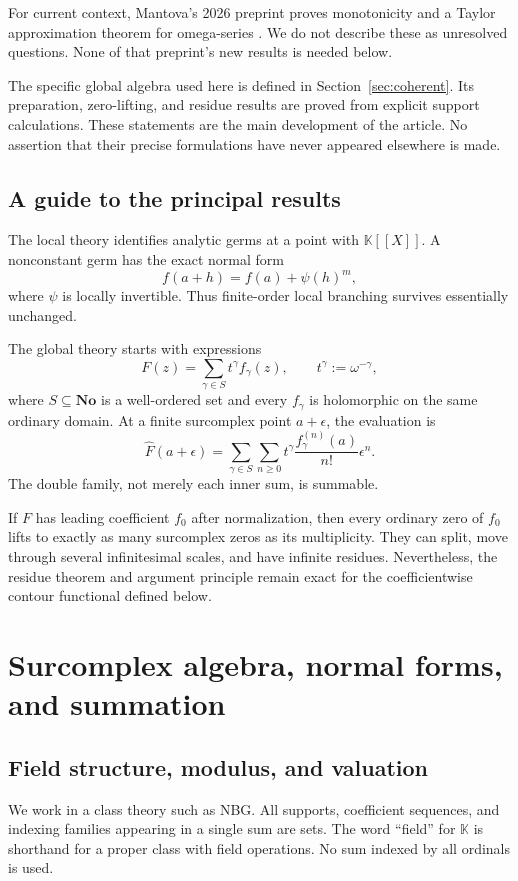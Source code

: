 \documentclass[11pt,a4paper]{article}
\theoremstyle{definition}\newtheorem{definition}[theorem]{Definition}
\theoremstyle{remark}\newtheorem{remark}[theorem]{Remark}
\newcommand{\No}{\mathbf{No}}
\newcommand{\K}{\mathbb K}
\newcommand{\ev}[1]{\widehat{#1}}
\numberwithin{equation}{section}
\begin{document}
For current context, Mantova's 2026 preprint proves monotonicity and a Taylor approximation theorem for omega-series \cite{Mantova2026}. We do not describe these as unresolved questions. None of that preprint's new results is needed below.

The specific global algebra used here is defined in Section~\ref{sec:coherent}. Its preparation, zero-lifting, and residue results are proved from explicit support calculations. These statements are the main development of the article. No assertion that their precise formulations have never appeared elsewhere is made.

\subsection{A guide to the principal results}
The local theory identifies analytic germs at a point with $\K[[X]]$. A nonconstant germ has the exact normal form
\[
 f(a+h)=f(a)+\psi(h)^m,
\]
where $\psi$ is locally invertible. Thus finite-order local branching survives essentially unchanged.

The global theory starts with expressions
\[
 F(z)=\sum_{\gamma\in S}t^\gamma f_\gamma(z),
 \qquad t^\gamma:=\omega^{-\gamma},
\]
where $S\subseteq\No$ is a well-ordered set and every $f_\gamma$ is holomorphic on the same ordinary domain. At a finite surcomplex point $a+\epsilon$, the evaluation is
\[
 \ev F(a+\epsilon)
 =\sum_{\gamma\in S}\sum_{n\geq0}
 t^\gamma\frac{f_\gamma^{(n)}(a)}{n!}\epsilon^n.
\]
The double family, not merely each inner sum, is summable.

If $F$ has leading coefficient $f_0$ after normalization, then every ordinary zero of $f_0$ lifts to exactly as many surcomplex zeros as its multiplicity. They can split, move through several infinitesimal scales, and have infinite residues. Nevertheless, the residue theorem and argument principle remain exact for the coefficientwise contour functional defined below.

\section{Surcomplex algebra, normal forms, and summation}\label{sec:foundations}

\subsection{Field structure, modulus, and valuation}
We work in a class theory such as NBG. All supports, coefficient sequences, and indexing families appearing in a single sum are sets. The word ``field'' for $\K$ is shorthand for a proper class with field operations. No sum indexed by all ordinals is used.
\end{document}
